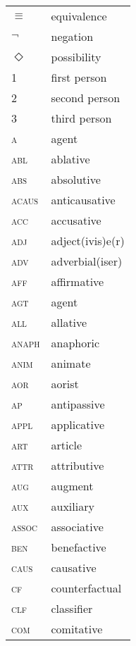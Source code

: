 

\begin{multicols}{2} 
\begin{tabular}{@{}lp{4cm}}  
$\equiv$ & equivalence\\
$\neg$ & negation\\
$\Diamond$ & possibility\\
1& first person\\
2& second person\\
3& third person\\
\textsc{a}&agent\\
\textsc{abl}&ablative\\
\textsc{abs}&absolutive\\
\textsc{acaus}&anticausative\\
\textsc{acc}&accusative\\
\textsc{adj}&adject(ivis)e(r)\\
\textsc{adv}&adverbial(iser)\\
\textsc{aff}&affirmative\\
\textsc{agt}&agent\\
\textsc{all}&allative\\
\textsc{anaph}&anaphoric\\
\textsc{anim}&animate\\
\textsc{aor}&aorist\\
\textsc{ap} & antipassive\\
\textsc{appl} & applicative\\
\textsc{art}&article\\
\textsc{attr}&attributive\\
\textsc{aug}&augment\\
\textsc{aux}&auxiliary\\
\textsc{assoc} & associative\\
\textsc{ben}&benefactive\\
\textsc{caus}&causative\\
\textsc{cf}&counterfactual\\
\textsc{clf}&classifier\\
\textsc{com}&comitative\\
\end{tabular}


\end{multicols}
